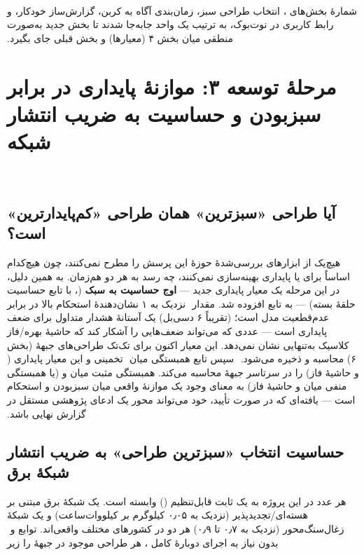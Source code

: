 ‫\documentclass[a4paper,12pt]{article}
\begin{document}
‫شمارهٔ بخش‌های ، انتخاب طراحی سبز، زمان‌بندی آگاه به
‫کربن، گزارش‌ساز خودکار، و رابط کاربری در نوت‌بوک، به ترتیب یک واحد
‫جابه‌جا شدند تا بخش جدید  به‌صورت منطقی میان بخش ۴ (معیارها)
‫و بخش قبلی  جای بگیرد.
‫
‫\section{مرحلهٔ توسعه ۳: موازنهٔ پایداری در برابر سبزبودن و حساسیت به ضریب انتشار شبکه}
‫
‫\subsection{آیا طراحی «سبزترین» همان طراحی «کم‌پایدارترین» است؟}
‫هیچ‌یک از ابزارهای بررسی‌شدهٔ حوزهٔ  این
‫پرسش را مطرح نمی‌کنند، چون هیچ‌کدام اساساً برای  یا پایداری
‫بهینه‌سازی نمی‌کنند، چه رسد به هر دو هم‌زمان. به همین دلیل، در این
‫مرحله یک معیار پایداری جدید — \textbf{اوج حساسیت به سبک }
‫(، با  تابع
‫حساسیت حلقهٔ بسته) — به تابع \texttt{} افزوده شد. مقدار
‫ نزدیک به ۱ نشان‌دهندهٔ استحکام بالا در برابر عدم‌قطعیت
‫مدل است؛  (تقریباً ۶ دسی‌بل) یک آستانهٔ هشدار متداول
‫برای ضعف پایداری است — عددی که می‌تواند ضعف‌هایی را آشکار کند که
‫حاشیهٔ بهره/فاز کلاسیک به‌تنهایی نشان نمی‌دهد. این معیار اکنون برای
‫تک‌تک طراحی‌های جبههٔ  (بخش ۶) محاسبه و ذخیره می‌شود.
‫
‫سپس تابع \texttt{} همبستگی میان
‫ تخمینی و این معیار پایداری ( و حاشیهٔ فاز) را در
‫سرتاسر جبههٔ  محاسبه می‌کند. همبستگی مثبت میان 
‫و  (یا همبستگی منفی میان  و حاشیهٔ فاز) به معنای
‫وجود یک موازنهٔ واقعی میان سبزبودن و استحکام است — یافته‌ای که در
‫صورت تأیید، خود می‌تواند محور یک ادعای پژوهشی مستقل در گزارش نهایی
‫باشد.
‫
‫\subsection{حساسیت انتخاب «سبزترین طراحی» به ضریب انتشار شبکهٔ برق}
‫هر عدد  در این پروژه به یک ثابت قابل‌تنظیم
‫(\texttt{}) وابسته است. یک شبکهٔ برق مبتنی
‫بر هسته‌ای/تجدیدپذیر (نزدیک به ۰٫۰۵ کیلوگرم بر کیلووات‌ساعت) و
‫یک شبکهٔ زغال‌سنگ‌محور (نزدیک به ۰٫۷ تا ۰٫۹) هر دو در
‫کشورهای مختلف واقعی‌اند. توابع \texttt{} و
‫\texttt{} بدون نیاز به اجرای دوبارهٔ کامل
‫،  هر طراحی موجود در جبههٔ  را زیر
\end{document}
